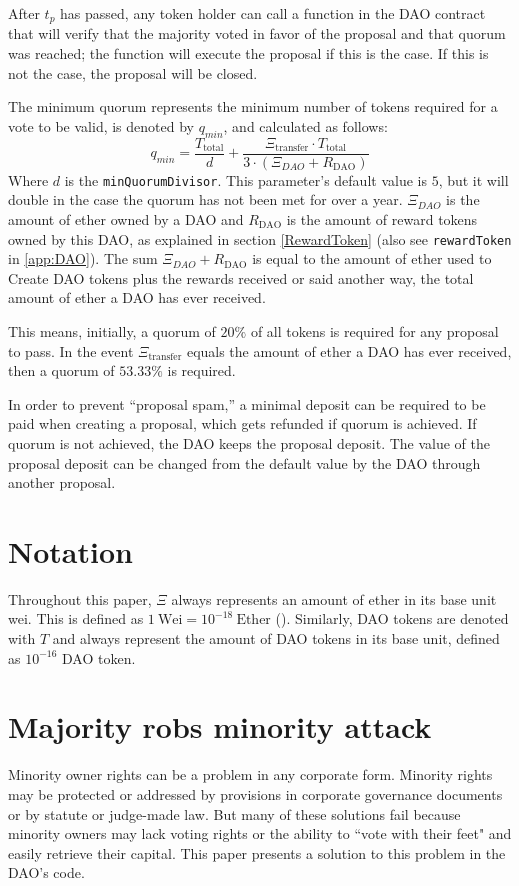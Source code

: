 \documentclass[9pt,oneside]{amsart}
\begin{document}
\begin{multicols}{2}
After $t_p$ has passed, any token holder can call a function in the DAO contract that will verify that the majority voted in favor of the proposal and that quorum was reached; the function will execute the proposal if this is the case. If this is not the case, the proposal will be closed. 

The minimum quorum represents the minimum number of tokens required for a vote to be valid, is denoted by $q_{min}$, and calculated as follows:
\begin{equation}
 q_{min} = \frac{T_{\text{total}}}{d} + \frac{\Xi_{\text{transfer}} \cdot T_{\text{total}}}{3 \cdot (\Xi_{DAO} + R_{\text{DAO}})}
 \label{minQuorum}
\end{equation}
Where $d$ is the \verb|minQuorumDivisor|. This parameter's default value is $5$, but it will double in the case the quorum has not been met for over a year.
$\Xi_{DAO}$ is the amount of ether owned by a DAO and $R_{\text{DAO}}$ is the amount of reward tokens owned by this DAO, as explained in section \ref{RewardToken} (also see \verb|rewardToken| in \ref{app:DAO}). The sum $\Xi_{DAO} + R_{\text{DAO}}$ is equal to the amount of ether used to Create DAO tokens plus the rewards received or said another way, the total amount of ether a DAO has ever received.

This means, initially, a quorum of  $20\%$ of all tokens is required for any proposal to pass. In the event $\Xi_{\text{transfer}}$ equals the amount of ether a DAO has ever received, then a quorum of $53.33\%$ is required.

In order to prevent ``proposal spam,'' a minimal deposit can be required to be paid when creating a proposal, which gets refunded if quorum is achieved. If quorum is not achieved, the DAO keeps the proposal deposit. The value of the proposal deposit can be changed from the default value by the DAO through another proposal.

\section{Notation}
Throughout this paper, $\Xi$ always represents an amount of ether in its base unit wei. This is defined as $1 \: \text{Wei} = 10^{-18} \: \text{Ether}$ (\cite{Wood2014ethereum}).
Similarly, DAO tokens are denoted with $T$ and always represent the amount of DAO tokens in its base unit, defined as $10^{-16}$ DAO token.

\section{Majority robs minority attack}
Minority owner rights can be a problem in any corporate form. Minority rights may be protected or addressed by provisions in corporate governance documents or by statute or judge-made law. But many of these solutions fail because minority owners may lack voting rights or the ability to ``vote with their feet" and easily retrieve their capital. This paper presents a solution to this problem in the DAO's code. 


\end{multicols}
\end{document}
